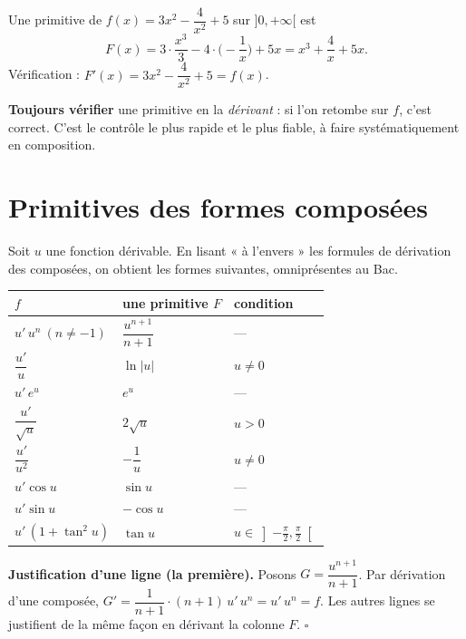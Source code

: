 \begin{exemple}
Une primitive de $f(x)=3x^{2}-\dfrac4{x^{2}}+5$ sur $]0,+\infty[$ est
\[
F(x)=3\cdot\frac{x^{3}}{3}-4\cdot\Big(-\frac1x\Big)+5x=x^{3}+\frac4x+5x .
\]
Vérification : $F'(x)=3x^{2}-\dfrac4{x^{2}}+5=f(x)$. \checkmark
\end{exemple}

\begin{aretenir}
\textbf{Toujours vérifier} une primitive en la \emph{dérivant} : si l'on retombe sur $f$,
c'est correct. C'est le contrôle le plus rapide et le plus fiable, à faire systématiquement
en composition.
\end{aretenir}

\section{Primitives des formes composées}

\noindent Soit $u$ une fonction dérivable. En lisant « à l'envers » les formules de
dérivation des composées, on obtient les formes suivantes, omniprésentes au Bac.

\begin{propriete}
\begin{center}\small
\renewcommand{\arraystretch}{1.7}
\begin{tabular}{@{}lll@{}}
\toprule
$f$ & une primitive $F$ & condition\\
\midrule
$u'\,u^{n}\ (n\neq-1)$ & $\dfrac{u^{n+1}}{n+1}$ & ---\\
$\dfrac{u'}{u}$ & $\ln|u|$ & $u\neq0$\\
$u'\,e^{u}$ & $e^{u}$ & ---\\
$\dfrac{u'}{\sqrt u}$ & $2\sqrt u$ & $u>0$\\
$\dfrac{u'}{u^{2}}$ & $-\dfrac1u$ & $u\neq0$\\
$u'\cos u$ & $\sin u$ & ---\\
$u'\sin u$ & $-\cos u$ & ---\\
$u'\,(1+\tan^{2}u)$ & $\tan u$ & $u\in\left]-\frac\pi2,\frac\pi2\right[$\\
\bottomrule
\end{tabular}
\end{center}
\end{propriete}

\noindent\textbf{Justification d'une ligne (la première).} Posons $G=\dfrac{u^{n+1}}{n+1}$.
Par dérivation d'une composée, $G'=\dfrac{1}{n+1}\cdot(n+1)\,u'\,u^{n}=u'\,u^{n}=f$.
Les autres lignes se justifient de la même façon en dérivant la colonne $F$. \hfill$\square$

